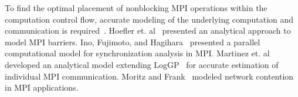 To find the optimal placement of nonblocking MPI operations within the computation control flow,
accurate modeling of the underlying computation and communication is required~\cite{brightwell:ics04}.
Hoefler et. al~\cite{hoefler:icppw05} presented an analytical approach to model MPI barriers.
Ino,  Fujimoto, and Hagihara~\cite{ino:ppopp2001} presented a parallel computational model for synchronization analysis in MPI.
Martinez et. al~\cite{martinez:ipdps09} developed an analytical model extending LogGP~\cite{loggp} for accurate estimation of individual MPI communication.
Moritz and Frank~\cite{moritz:tpds01} modeled network contention in MPI applications.


